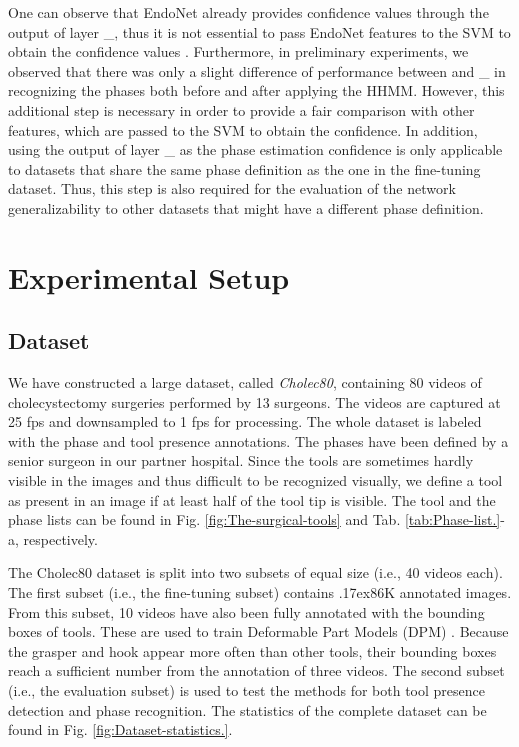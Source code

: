 \documentclass[journal]{IEEEtran} \usepackage{amssymb}
\newcommand{\mytilde}{\raise.17ex\hbox{}}
\begin{document}
One can observe that EndoNet already provides confidence values through the output of layer \_, thus it is not essential to pass EndoNet features to the SVM to obtain the confidence values . Furthermore, in preliminary experiments, we observed that there was only a slight difference of performance between  and \_ in recognizing the phases both before and after applying the HHMM.  However, this additional step is necessary in order to provide a fair comparison with other features, which are passed to the SVM to obtain the confidence. In addition, using the output of layer \_ as the phase estimation confidence is only applicable to datasets that share the same phase definition as the one in the fine-tuning dataset.
Thus, this step is also required for the evaluation of the network generalizability to other datasets that might have a different phase definition.


\section{Experimental Setup}


\subsection{Dataset \label{sub:Dataset}}

We have constructed a large dataset, called \textit{Cholec80},
containing 80 videos of cholecystectomy surgeries performed by 13 surgeons. 
The videos are captured at 25
fps and downsampled to 1 fps for processing. The whole dataset is
labeled with the phase and tool presence annotations. The phases have been defined by a senior surgeon in our partner hospital. Since the tools are sometimes hardly visible in the images and thus difficult to be recognized visually, we define a tool as present in an image if at least half of the tool tip is visible. The tool
and the phase lists can be found in Fig. \ref{fig:The-surgical-tools}
and Tab. \ref{tab:Phase-list.}-a, respectively. 

The Cholec80 dataset is split into two subsets of equal size (i.e.,
40 videos each). The first subset (i.e., the fine-tuning subset) contains \mytilde 86K annotated images.
From this subset, 10 videos have also been fully annotated with the bounding
boxes of tools. These are used to train Deformable Part Models
(DPM) \cite{DPM}.
Because the grasper and hook appear more often than other tools, their bounding boxes reach a sufficient number from the annotation of three videos. The second subset (i.e., the evaluation subset) is used to test the methods for both tool presence detection and phase recognition. The statistics of
the complete dataset can be found in Fig. \ref{fig:Dataset-statistics.}. 
\end{document}
